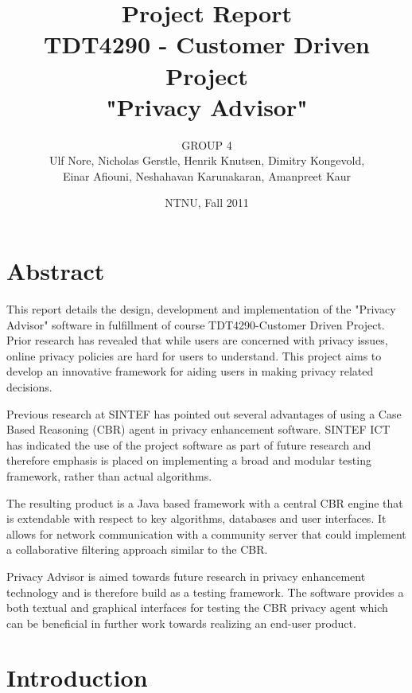 \documentclass[11pt,a4paper]{book}
\title{Project Report\\
TDT4290 - Customer Driven Project \\ 
"Privacy Advisor"}
\author{GROUP 4\\
Ulf Nore, Nicholas Gerstle, Henrik Knutsen, Dimitry Kongevold,\\ 
Einar Afiouni, Neshahavan Karunakaran, Amanpreet Kaur}
\date{NTNU, Fall 2011}
\begin{document}


\dominitoc 

\frontmatter

\chapter*{\centering Abstract}
This report details the design, development and implementation of the
"Privacy Advisor" software in fulfillment of course TDT4290-Customer
Driven Project. Prior research has revealed that while users are
concerned with privacy issues, online privacy policies are hard for
users to understand. This project aims to develop an
innovative framework for aiding users in making privacy related decisions.

Previous research at SINTEF has pointed
out several advantages of using a Case Based Reasoning (CBR) agent 
in privacy enhancement software. SINTEF ICT
has indicated the use of the project software as part of future
research and therefore emphasis is placed on implementing a broad
and modular testing framework, rather than actual algorithms.

The resulting product is a Java based framework with a central CBR
engine that is extendable with respect to key algorithms, databases
and user interfaces. It allows for network communication with a
community server that could implement a collaborative filtering approach 
similar to the CBR.

Privacy Advisor is aimed towards future research in privacy
enhancement technology and is therefore build as a testing
framework. The software provides a both textual and graphical
interfaces for testing the CBR privacy agent which can be beneficial
in further work towards realizing an end-user product.





\listoftables

\listoffigures

\tableofcontents \label{toc}



\chapter{Introduction}
\end{document}
